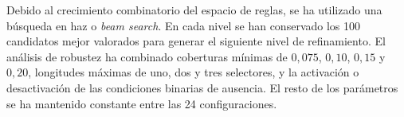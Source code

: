 Debido al crecimiento combinatorio del espacio de reglas, se ha utilizado una búsqueda en haz o \textit{beam search}. En cada nivel se han conservado los 100 candidatos mejor valorados para generar el siguiente nivel de refinamiento. El análisis de robustez ha combinado coberturas mínimas de \(0{,}075\), \(0{,}10\), \(0{,}15\) y \(0{,}20\), longitudes máximas de uno, dos y tres selectores, y la activación o desactivación de las condiciones binarias de ausencia. El resto de los parámetros se ha mantenido constante entre las 24 configuraciones.





